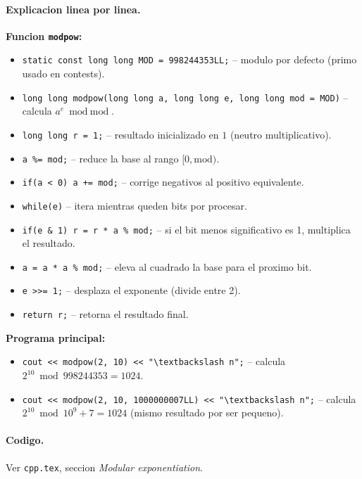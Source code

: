 \paragraph{Explicacion linea por linea.}
\textbf{Funcion \texttt{modpow}:}
\begin{itemize}\setlength\itemsep{0pt}
	\item \verb|static const long long MOD = 998244353LL;| -- modulo por defecto (primo usado en contests).
	\item \verb|long long modpow(long long a, long long e, long long mod = MOD)| -- calcula $a^e \bmod \text{mod}$.
	\item \verb|long long r = 1;| -- resultado inicializado en $1$ (neutro multiplicativo).
	\item \verb|a %= mod;| -- reduce la base al rango $[0, \text{mod})$.
	\item \verb|if(a < 0) a += mod;| -- corrige negativos al positivo equivalente.
	\item \verb|while(e)| -- itera mientras queden bits por procesar.
	\item \verb|if(e & 1) r = r * a % mod;| -- si el bit menos significativo es 1, multiplica el resultado.
	\item \verb|a = a * a % mod;| -- eleva al cuadrado la base para el proximo bit.
	\item \verb|e >>= 1;| -- desplaza el exponente (divide entre 2).
	\item \verb|return r;| -- retorna el resultado final.
\end{itemize}
\textbf{Programa principal:}
\begin{itemize}\setlength\itemsep{0pt}
	\item \verb|cout << modpow(2, 10) << "\textbackslash n";| -- calcula $2^{10} \bmod 998244353 = 1024$.
	\item \verb|cout << modpow(2, 10, 1000000007LL) << "\textbackslash n";| -- calcula $2^{10} \bmod 10^9+7 = 1024$ (mismo resultado por ser pequeno).
\end{itemize}

\paragraph{Codigo.}
Ver \texttt{cpp.tex}, seccion \textit{Modular exponentiation}.

\vspace{0.5em|||}
